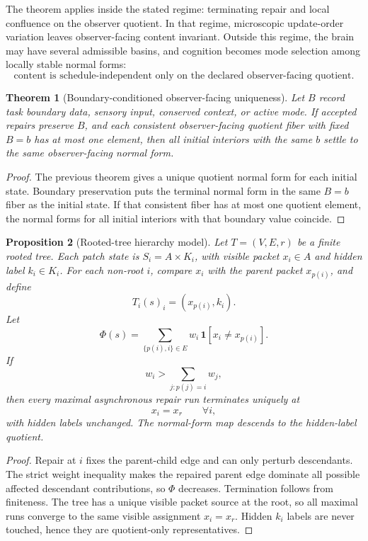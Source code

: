 \documentclass[11pt]{article}
\newtheorem{theorem}{Theorem}[section]
\newtheorem{proposition}[theorem]{Proposition}
\theoremstyle{remark}
\theoremstyle{plain}
\begin{document}
The theorem applies inside the stated regime: terminating repair and local confluence on the observer quotient. In that regime, microscopic update-order variation leaves observer-facing content invariant. Outside this regime, the brain may have several admissible basins, and cognition becomes mode selection among locally stable normal forms:
\[
\boxed{
\text{content is schedule-independent only on the declared observer-facing quotient.}
}
\]

\begin{theorem}[Boundary-conditioned observer-facing uniqueness]
Let \(B\) record task boundary data, sensory input, conserved context, or active mode. If accepted
repairs preserve \(B\), and each consistent observer-facing quotient fiber with fixed \(B=b\) has
at most one element, then all initial interiors with the same \(b\) settle to the same
observer-facing normal form.
\end{theorem}

\begin{proof}
The previous theorem gives a unique quotient normal form for each initial state. Boundary
preservation puts the terminal normal form in the same \(B=b\) fiber as the initial state. If that
consistent fiber has at most one quotient element, the normal forms for all initial interiors with
that boundary value coincide.
\end{proof}

\begin{proposition}[Rooted-tree hierarchy model]
Let \(T=(V,E,r)\) be a finite rooted tree. Each patch state is \(S_i=A\times K_i\), with visible packet \(x_i\in A\) and hidden label \(k_i\in K_i\). For each non-root \(i\), compare \(x_i\) with the parent packet \(x_{p(i)}\), and define
\[
T_i(s)_i=(x_{p(i)},k_i).
\]
Let
\[
\Phi(s)=
\sum_{\{p(i),i\}\in E}
w_i\,\mathbf 1[x_i\ne x_{p(i)}].
\]
If
\[
w_i>\sum_{j:p(j)=i}w_j,
\]
then every maximal asynchronous repair run terminates uniquely at
\[
x_i=x_r\qquad\forall i,
\]
with hidden labels unchanged. The normal-form map descends to the hidden-label quotient.
\end{proposition}

\begin{proof}
Repair at \(i\) fixes the parent-child edge and can only perturb descendants. The strict weight inequality makes the repaired parent edge dominate all possible affected descendant contributions, so \(\Phi\) decreases. Termination follows from finiteness. The tree has a unique visible packet source at the root, so all maximal runs converge to the same visible assignment \(x_i=x_r\). Hidden \(k_i\) labels are never touched, hence they are quotient-only representatives.
\end{proof}
\end{document}
